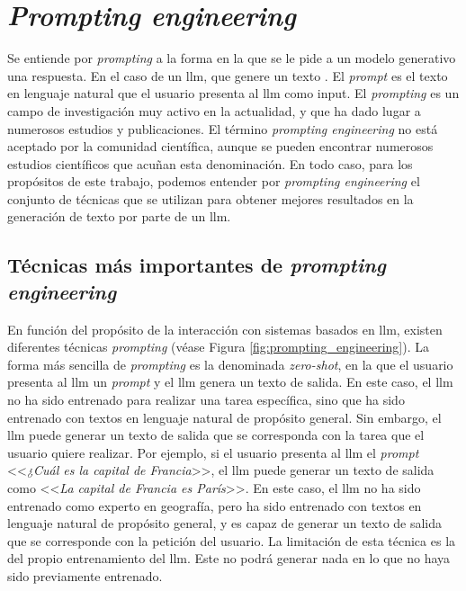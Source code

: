 \section{\emph{Prompting engineering}}
\label{sec:llm_tecnicas_prompting}

Se entiende por \emph{prompting} a la forma en la que se le pide a un modelo generativo una respuesta. En el caso de un \gls{llm}, que genere un texto \citep{LLMPromptingGuide}. El \emph{prompt} es el texto en lenguaje natural que el usuario presenta al \gls{llm} como input. El \emph{prompting} es un campo de investigación muy activo en la actualidad, y que ha dado lugar a numerosos estudios y publicaciones. El término \emph{prompting engineering} no está aceptado por la comunidad científica, aunque se pueden encontrar numerosos estudios científicos que acuñan esta denominación. En todo caso, para los propósitos de este trabajo, podemos entender por \emph{prompting engineering} el conjunto de técnicas que se utilizan para obtener mejores resultados en la generación de texto por parte de un \gls{llm}. 

\subsection{Técnicas más importantes de \emph{prompting engineering}}

En función del propósito de la interacción con sistemas basados en \gls{llm}, existen diferentes técnicas \emph{prompting} (véase Figura \ref{fig:prompting_engineering}). La forma más sencilla de \emph{prompting} es la denominada \emph{zero-shot}, en la que el usuario presenta al \gls{llm} un \emph{prompt} y el \gls{llm} genera un texto de salida. En este caso, el \gls{llm} no ha sido entrenado para realizar una tarea específica, sino que ha sido entrenado con textos en lenguaje natural de propósito general. Sin embargo, el \gls{llm} puede generar un texto de salida que se corresponda con la tarea que el usuario quiere realizar. Por ejemplo, si el usuario presenta al \gls{llm} el \emph{prompt} <<\emph{¿Cuál es la capital de Francia}>>, el \gls{llm} puede generar un texto de salida como <<\emph{La capital de Francia es París}>>. En este caso, el \gls{llm} no ha sido entrenado como experto en geografía, pero ha sido entrenado con textos en lenguaje natural de propósito general, y es capaz de generar un texto de salida que se corresponde con la petición del usuario. La limitación de esta técnica es la del propio entrenamiento del \gls{llm}. Este no podrá generar nada en lo que no haya sido previamente entrenado.


